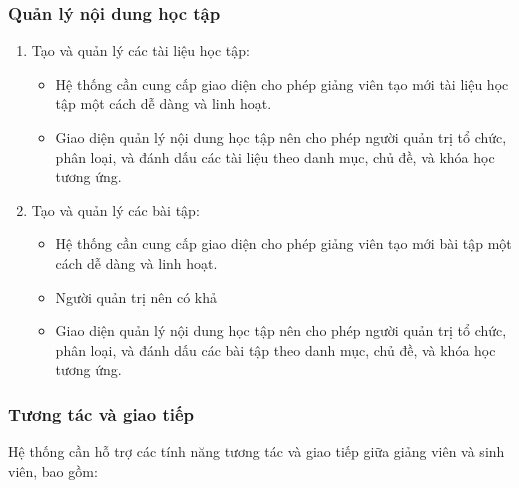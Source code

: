 \documentclass[../Thesis.tex]{subfiles}
\begin{document}
        \subsubsection{Quản lý nội dung học tập}

            \begin{enumerate}
                \item Tạo và quản lý các tài liệu học tập:
                    \begin{itemize}[label=$\bullet$]
                        
                        \item Hệ thống cần cung cấp giao diện cho phép giảng viên tạo mới tài liệu học tập một cách dễ dàng và linh hoạt.
                        
                        \item Giao diện quản lý nội dung học tập nên cho phép người quản trị tổ chức, phân loại, và đánh dấu các tài liệu theo danh mục, chủ đề, và khóa học tương ứng.
                    \end{itemize}

                \item Tạo và quản lý các bài tập:
                    \begin{itemize}[label=$\bullet$]
                        \item Hệ thống cần cung cấp giao diện cho phép giảng viên tạo mới bài tập một cách dễ dàng và linh hoạt.
                        \item Người quản trị nên có khả
                        \item Giao diện quản lý nội dung học tập nên cho phép người quản trị tổ chức, phân loại, và đánh dấu các bài tập theo danh mục, chủ đề, và khóa học tương ứng.
                    \end{itemize}
            \end{enumerate}

        \subsubsection{Tương tác và giao tiếp}

            Hệ thống cần hỗ trợ các tính năng tương tác và giao tiếp giữa giảng viên và sinh viên, bao gồm:
\end{document}
